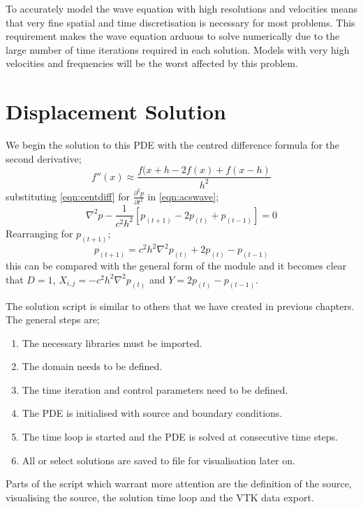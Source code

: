 To accurately model the wave equation with high resolutions and velocities
means that very fine spatial and time discretisation is necessary for most
problems.  This requirement makes the wave equation arduous to
solve numerically due to the large number of time iterations required in each
solution. Models with very high velocities and frequencies will be the worst
affected by this problem.

\section{Displacement Solution}

We begin the solution to this PDE with the centred difference formula for the
second derivative;
\begin{equation}
 f''(x) \approx \frac{f(x+h - 2f(x) + f(x-h)}{h^2}
\label{eqn:centdiff}
\end{equation}
substituting \autoref{eqn:centdiff} for $\frac{\partial ^2 p }{\partial t ^2}$
in \autoref{eqn:acswave};
\begin{equation}
 \nabla ^2 p - \frac{1}{c^2h^2} \left[p_{(t+1)} - 2p_{(t)} +
p_{(t-1)} \right]
= 0
\label{eqn:waveu}
\end{equation}
Rearranging for $p_{(t+1)}$;
\begin{equation}
 p_{(t+1)} = c^2 h^2 \nabla ^2 p_{(t)} +2p_{(t)} -
p_{(t-1)}
\end{equation}
this can be compared with the general form of the \modLPDE module and it
becomes clear that $D=1$, $X_{i,j}=-c^2 h^2 \nabla ^2 p_{(t)}$ and
$Y=2p_{(t)} - p_{(t-1)}$.

The solution script is similar to others that we have created in previous
chapters. The general steps are;
\begin{enumerate}
 \item The necessary libraries must be imported.
 \item The domain needs to be defined.
 \item The time iteration and control parameters need to be defined.
 \item The PDE is initialised with source and boundary conditions.
 \item The time loop is started and the PDE is solved at consecutive time steps.
 \item All or select solutions are saved to file for visualisation later on.
\end{enumerate}

Parts of the script which warrant more attention are the definition of the
source, visualising the source, the solution time loop and the VTK data export.

